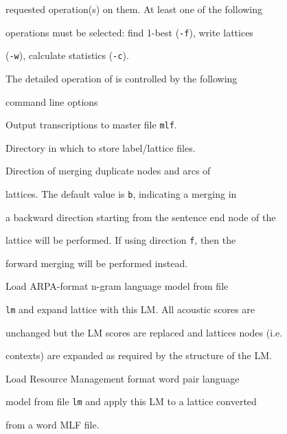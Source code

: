 requested operation(s) on them. At least one of the following


operations must be selected: find 1-best (\texttt{-f}), write lattices


(\texttt{-w}), calculate statistics (\texttt{-c}).








The detailed operation of  is controlled by the following


command line options


\begin{optlist}





   Output transcriptions to master file \texttt{mlf}.





   Directory in which to store label/lattice files.





   Direction of merging duplicate nodes and arcs of


  lattices. The default value is \texttt{b}, indicating a merging in


  a backward direction starting from the sentence end node of the


  lattice will be performed. If using direction \texttt{f}, then the


  forward merging will be performed instead. 





   Load ARPA-format n-gram language model from file


  \texttt{lm} and expand lattice with this LM. All acoustic scores are


  unchanged but the LM scores are replaced and lattices nodes (i.e.\


  contexts) are expanded as required by the structure of the LM.





   Load Resource Management format word pair language


  model from file \texttt{lm} and apply this LM to a lattice converted


  from a word MLF file. 






\end{optlist}
